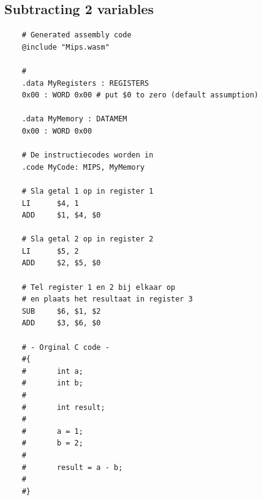 \documentclass[10pt]{article}
\begin{document}
\subsection{Subtracting 2 variables}
\begin{verbatim}
    # Generated assembly code
    @include "Mips.wasm"
     
    #
    .data MyRegisters : REGISTERS
    0x00 : WORD 0x00 # put $0 to zero (default assumption)
     
    .data MyMemory : DATAMEM
    0x00 : WORD 0x00
     
    # De instructiecodes worden in
    .code MyCode: MIPS, MyMemory
     
    # Sla getal 1 op in register 1
    LI      $4, 1
    ADD     $1, $4, $0
     
    # Sla getal 2 op in register 2
    LI      $5, 2
    ADD     $2, $5, $0
     
    # Tel register 1 en 2 bij elkaar op
    # en plaats het resultaat in register 3
    SUB     $6, $1, $2
    ADD     $3, $6, $0
     
    # - Orginal C code -
    #{
    #       int a;
    #       int b;
    #
    #       int result;
    #
    #       a = 1;
    #       b = 2;
    #
    #       result = a - b;
    #
    #}

\end{verbatim}
\end{document}
